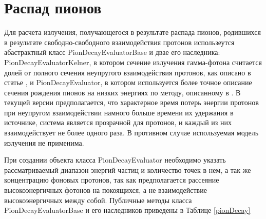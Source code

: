 \section{Распад пионов}

Для расчета излучения, получающегося в результате распада пионов, родившихся в результате свободно-свободного взаимодействия протонов использеутся абастрактный класс PionDecayEvaluatorBase и двае его наследника: PionDecayEvaluatorKelner, в котором сечение излучения гамма-фотона считается долей от полного сечения неупругого взаимодействия протонов, как описано в статье \cite{Kelner}, и PionDecayEvaluator, в котором используется более точное описание сечения рождения пионов на низких энергиях по методу, описанному в \cite{Kafexhiu}. В текущей версии предполагается, что характерное время потерь энергии протонов при неупругом взаимодействии намного больше времени их удержания в источнике, система является прозрачной для протонов, и каждый из них взаимодействует не более одного раза. В противном случае используемая модель излучения не применима.

При создании объекта класса PionDecayEvaluator необходимо указать рассматриваемый диапазон энергий частиц и количество точек в нем, а так же концентрацию фоновых протонов, так как предполагается рассеяние высокоэнергичных фотонов на покоящихся, а не взаимодействие высокоэнергичных между собой. Публичные методы класса PionDecayEvaluatorBase и его наследников приведены в Таблице \ref{pionDecay}

